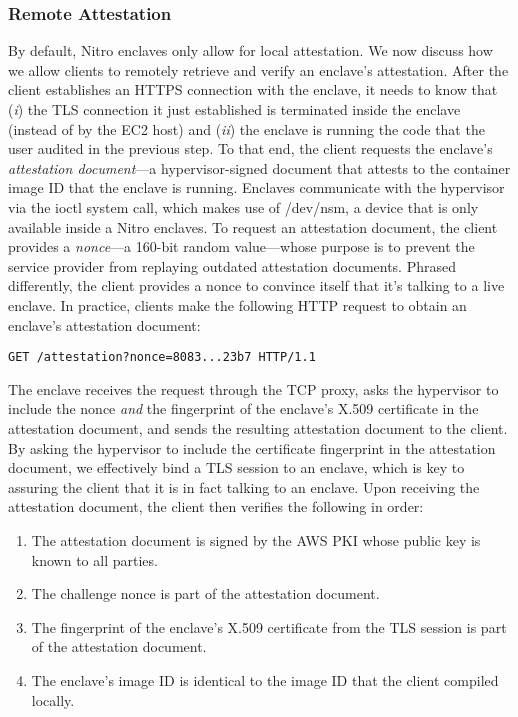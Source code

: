 \subsubsection{Remote Attestation}
\label{sec:attestation}

By default, Nitro enclaves only allow for local attestation.  We now discuss how
we allow clients to remotely retrieve and verify an enclave's attestation.
After the client establishes an HTTPS connection with the enclave, it needs to
know that (\emph{i}) the TLS connection it just established is terminated inside
the enclave (instead of by the EC2 host) and (\emph{ii}) the enclave is running
the code that the user audited in the previous step.  To that end, the client
requests the enclave's \emph{attestation document}---a hypervisor-signed
document that attests to the container image ID that the enclave is running.
Enclaves communicate with the hypervisor via the ioctl system call, which makes
use of /dev/nsm, a device that is only available inside a Nitro enclaves.  To
request an attestation document, the client provides a \emph{nonce}---a 160-bit
random value---whose purpose is to prevent the service provider from replaying
outdated attestation documents.  Phrased differently, the client provides a
nonce to convince itself that it's talking to a live enclave.  In practice,
clients make the following HTTP request to obtain an enclave's attestation
document:

\begin{lstlisting}[numbers=none,basicstyle=\small\ttfamily]
GET /attestation?nonce=8083...23b7 HTTP/1.1
\end{lstlisting}

The enclave receives the request through the TCP proxy, asks the hypervisor to
include the nonce \emph{and} the fingerprint of the enclave's X.509 certificate
in the attestation document, and sends the resulting attestation document to the
client.  By asking the hypervisor to include the certificate fingerprint in the
attestation document, we effectively bind a TLS session to an enclave, which is
key to assuring the client that it is in fact talking to an enclave.  Upon
receiving the attestation document, the client then verifies the following in
order:

\begin{enumerate}
    \item The attestation document is signed by the AWS PKI whose public key is
      known to all parties.
    \item The challenge nonce is part of the attestation document.
    \item The fingerprint of the enclave's X.509 certificate from the TLS session is part of the
      attestation document.
    \item The enclave's image ID is identical to the image ID that the client
      compiled locally.
\end{enumerate}

